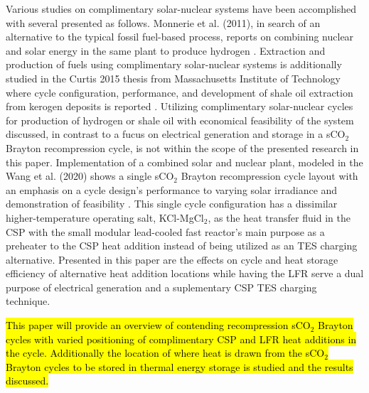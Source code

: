 Various studies on complimentary solar-nuclear systems have been accomplished with several presented as follows. Monnerie et al. (2011), in search of an alternative to the typical fossil fuel-based process, reports on combining nuclear and solar energy in the same plant to produce hydrogen \cite{monnerie_2011}.  Extraction and production of fuels using complimentary solar-nuclear systems is additionally studied in the Curtis 2015 thesis from Massachusetts Institute of Technology where cycle configuration, performance, and development of shale oil extraction from kerogen deposits is reported \cite{curtis_2015}. Utilizing complimentary solar-nuclear cycles for production of hydrogen or shale oil with economical feasibility of the system discussed, in contrast to a fucus on electrical generation and storage in a sCO$_2$ Brayton recompression cycle, is not within the scope of the presented research in this paper. Implementation of a combined solar and nuclear plant, modeled in the Wang et al. (2020) shows a single sCO$_2$ Brayton recompression cycle layout with an emphasis on a cycle design's performance to varying solar irradiance and demonstration of feasibility \cite{wang_2020}.  This single cycle configuration has a dissimilar higher-temperature operating salt, KCl-MgCl$_2$, as the heat transfer fluid in the CSP with the small modular lead-cooled fast reactor's main purpose as a preheater to the CSP heat addition instead of being utilized as an TES charging alternative. Presented in this paper are the effects on cycle and heat storage efficiency of alternative heat addition locations while having the LFR serve a dual purpose of electrical generation and a suplementary CSP TES charging technique. 

\hl{This paper will provide an overview of contending recompression sCO$_2$ Brayton cycles with varied positioning of complimentary CSP and LFR heat additions in the cycle. Additionally the location of where heat is drawn from the sCO$_2$ Brayton cycles to be stored in thermal energy storage is studied and the results discussed.}



